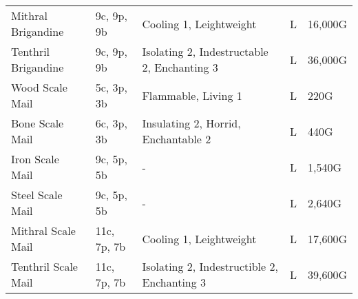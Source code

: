 \begin{longtable}{p{3.5cm} | p{1.5cm} | p{5cm} | p{1cm} | p{1.25cm}}
	Mithral Brigandine & 9c, 9p, 9b & Cooling 1, Leightweight & L & 16,000G\\
	
	Tenthril Brigandine & 9c, 9p, 9b & Isolating 2, Indestructable 2, Enchanting 3 & L & 36,000G\\
	
	Wood Scale Mail & 5c, 3p, 3b & Flammable, Living 1 & L & 220G\\
	
	Bone Scale Mail & 6c, 3p, 3b & Insulating 2, Horrid, Enchantable 2 & L & 440G\\
	
	Iron Scale Mail & 9c, 5p, 5b & - & L & 1,540G\\
	
	Steel Scale Mail & 9c, 5p, 5b & - & L & 2,640G\\
	
	Mithral Scale Mail & 11c, 7p, 7b & Cooling 1, Leightweight & L & 17,600G\\
	
	Tenthril Scale Mail & 11c, 7p, 7b & Isolating 2, Indestructible 2, Enchanting 3 & L & 39,600G\\
\end{longtable}